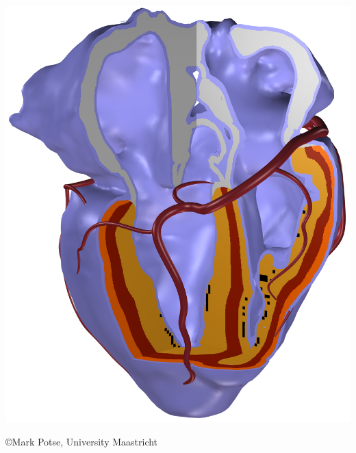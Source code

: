 \documentclass[20pt]{ICSPoster}
\begin{document}
\begin{posterbox}[2]
\begin{headerbox}[
        title=Background: Understanding Cardiac Resynchronization Therapy,
        height=0.25\textheight,
        width=0.47\textwidth]
\begin{minipage}{0.55\textwidth}
      \end{minipage}
      \begin{minipage}{0.25\textwidth}\sf
        \vspace{0.5cm}
        \hspace{1cm}
        \includegraphics[height=1.8\textwidth]{anatomy.png}
        \begin{flushright}
        {\tiny \copyright Mark Potse, University Maastricht}
        \end  {flushright}
      \end{minipage}


\end{headerbox}
\end{posterbox}
\end{document}
